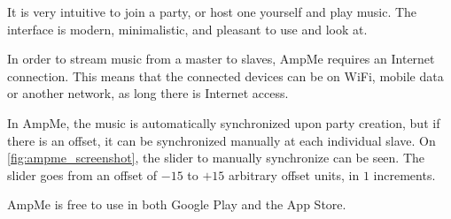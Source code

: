 It is very intuitive to join a party, or host one yourself and play music.
The interface is modern, minimalistic, and pleasant to use and look at.

In order to stream music from a master to slaves, AmpMe requires an Internet connection.
This means that the connected devices can be on WiFi, mobile data or another network, as long there is Internet access.

In AmpMe, the music is automatically synchronized upon party creation, but if there is an offset, it can be synchronized manually at each individual slave.
On \cref{fig:ampme_screenshot}, the slider to manually synchronize can be seen.
The slider goes from an offset of $-15$ to $+15$ arbitrary offset units, in $1$ increments.

AmpMe is free to use in both Google Play and the App Store.\cite{amp_faq}\cite{amp_play}\cite{amp_itunes}


